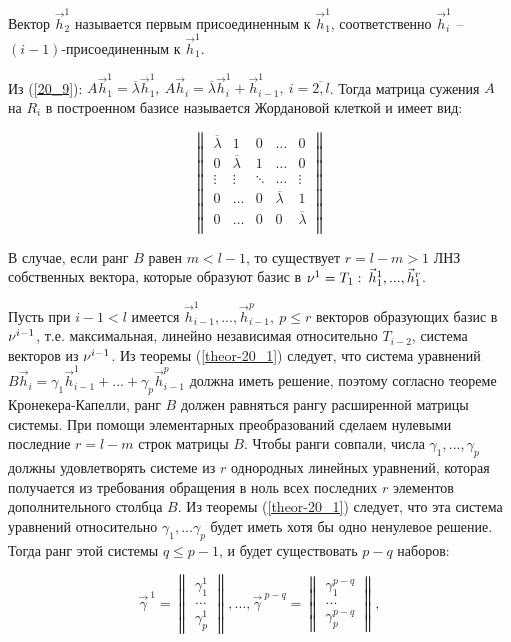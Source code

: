 Вектор $\vec{h}_2^1$ называется первым присоединенным к $\vec{h}_1^1$, соответственно $\vec{h}_i^1$ -- $(i-1)$-присоединенным к $\vec{h}_1^1$.

Из (\ref{20_9}): $A\vec{h}_1^1 = \overline{\lambda} \vec{h}_1^1, \: A\vec{h}_i = \overline{\lambda} \vec{h}_i^1 + \vec{h}_{i-1}^1, \: i = \overline{2,l}$. Тогда матрица сужения $A$ на $R_i$ в построенном базисе называется Жордановой клеткой и имеет вид:

\begin{equation*}
	\begin{Vmatrix}
		\overline{\lambda} 	& 1 	& 0 	& \ldots 	& 0 \\
		0 	& \overline{\lambda} 	& 1 	& \ldots	& 0 \\
		\vdots  & \vdots & \ddots & \ldots & \vdots \\
		0 & \ldots & 0 & \overline{\lambda} & 1 \\
		0 & \ldots & 0 & 0 & \overline{\lambda} \\
	\end{Vmatrix}
\end{equation*}

В случае, если ранг $B$ равен $m < l - 1$, то существует $r = l - m > 1$ ЛНЗ собственных вектора, которые образуют базис в $\nu^1 = T_1 : \: \vec{h}_1^1, ... , \vec{h}_1^r$.

Пусть при $i-1 < l$ имеется $\vec{h}_{i-1}^1, ... , \vec{h}_{i-1}^p, \: p \leqslant r$ векторов образующих базис в $\nu^{i-1}$, т.е. максимальная, линейно независимая относительно $T_{i-2}$, система векторов из $\nu^{i-1}$.  Из теоремы (\ref{theor-20_1}) следует, что система уравнений $B\vec{h}_i = \gamma_1 \vec{h}_{i-1}^1 + ... + \gamma_p \vec{h}_{i-1}^p$ должна иметь решение, поэтому согласно теореме Кронекера-Капелли, ранг $B$ должен равняться рангу расширенной матрицы системы. При помощи элементарных преобразований сделаем нулевыми последние $r = l - m$ строк матрицы $B$. Чтобы ранги совпали, числа $\gamma_1, ... , \gamma_p$ должны удовлетворять системе из $r$ однородных линейных уравнений, которая получается из требования обращения в ноль всех последних $r$ элементов дополнительного столбца $B$. Из теоремы (\ref{theor-20_1}) следует, что эта система уравнений относительно $\gamma_1, ... \gamma_p$ будет иметь хотя бы одно ненулевое решение. Тогда ранг этой системы $q \leqslant p - 1$, и будет существовать $p-q$ наборов:

\begin{equation*}
	\vec{\gamma}^{\: 1} =
	\begin{Vmatrix}
		\gamma_1^1 \\
		...         \\
		\gamma_p^1
	\end{Vmatrix}
	, ... ,
	\vec{\gamma}^{\: p-q} = 
	\begin{Vmatrix}
		\gamma_1^{p-q} \\
		...         \\
		\gamma_p^{p-q}
	\end{Vmatrix}
	,
\end{equation*} 


